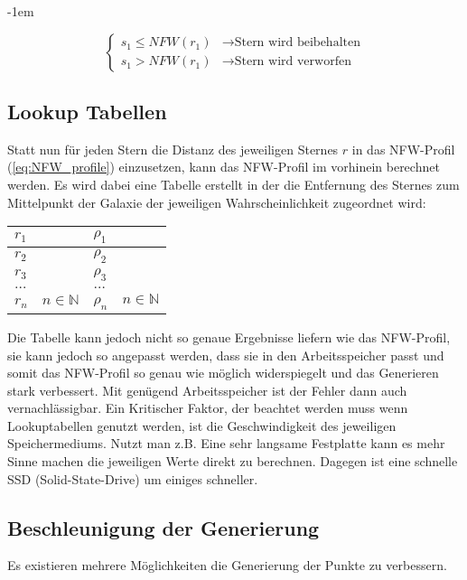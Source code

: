 \kern-1em

\begin{equation}\label{cases:random_sampling}
\begin{cases}
s_1 \leq NFW(r_1) & \rightarrow \text{Stern wird beibehalten}\\
s_1 > NFW(r_1) & \rightarrow \text{Stern wird verworfen}
\end{cases} 
\end{equation}


\subsection{Lookup Tabellen}
Statt nun für jeden Stern die Distanz des jeweiligen Sternes \( r \) in das
NFW-Profil (\ref{eq:NFW_profile}) einzusetzen, kann das NFW-Profil im vorhinein
berechnet werden. Es wird dabei eine Tabelle erstellt in der die Entfernung des
Sternes zum Mittelpunkt der Galaxie der jeweiligen Wahrscheinlichkeit
zugeordnet wird:

\begin{center}
\begin{tabular} {l | l}
    \( r_1 \) & \( \rho_1 \) \\ \hline
    \( r_2 \) & \( \rho_2 \) \\ \hline
    \( r_3 \) & \( \rho_3 \) \\ \hline
    \( \dots \) & \( \dots \) \\ \hline
    \( r_n \quad n \in \mathbb{N} \) & \( \rho_n \quad n \in \mathbb{N} \) \\ \hline
\end{tabular}
\end{center}

Die Tabelle kann jedoch nicht so genaue Ergebnisse liefern wie das NFW-Profil,
sie kann jedoch so angepasst werden, dass sie in den Arbeitsspeicher passt und
somit das NFW-Profil so genau wie möglich widerspiegelt und das Generieren
stark verbessert. Mit genügend Arbeitsspeicher ist der Fehler dann auch
vernachlässigbar. Ein Kritischer Faktor, der beachtet werden muss wenn
Lookuptabellen genutzt werden, ist die Geschwindigkeit des jeweiligen
Speichermediums. Nutzt man z.B. Eine sehr langsame Festplatte kann es mehr
Sinne machen die jeweiligen Werte direkt zu berechnen. Dagegen ist eine
schnelle SSD (Solid-State-Drive) um einiges schneller.

\subsection{Beschleunigung der Generierung}
Es existieren mehrere Möglichkeiten die Generierung der Punkte zu verbessern.

